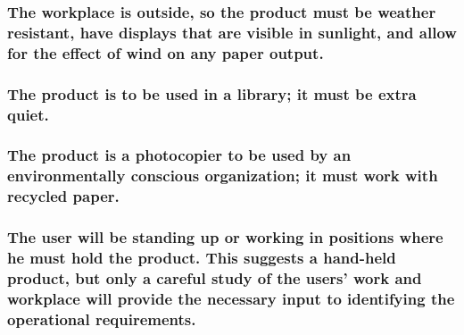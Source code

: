 \documentclass[
]{article}
\begin{document}
\hypertarget{the-workplace-is-outside-so-the-product-must-be-weather-resistant-have-displays-that-are-visible-in-sunlight-and-allow-for-the-effect-of-wind-on-any-paper-output.}{%
\subsubsection{\texorpdfstring{The workplace is outside, so the product
must be weather resistant, have displays that are visible in sunlight,
and allow for the effect of wind on any paper output.
}{The workplace is outside, so the product must be weather resistant, have displays that are visible in sunlight, and allow for the effect of wind on any paper output. }}\label{the-workplace-is-outside-so-the-product-must-be-weather-resistant-have-displays-that-are-visible-in-sunlight-and-allow-for-the-effect-of-wind-on-any-paper-output.}}

\hypertarget{the-product-is-to-be-used-in-a-library-it-must-be-extra-quiet.}{%
\subsubsection{\texorpdfstring{The product is to be used in a library;
it must be extra quiet.
}{The product is to be used in a library; it must be extra quiet. }}\label{the-product-is-to-be-used-in-a-library-it-must-be-extra-quiet.}}

\hypertarget{the-product-is-a-photocopier-to-be-used-by-an-environmentally-conscious-organization-it-must-work-with-recycled-paper.}{%
\subsubsection{\texorpdfstring{The product is a photocopier to be used
by an environmentally conscious organization; it must work with recycled
paper.
}{The product is a photocopier to be used by an environmentally conscious organization; it must work with recycled paper. }}\label{the-product-is-a-photocopier-to-be-used-by-an-environmentally-conscious-organization-it-must-work-with-recycled-paper.}}

\hypertarget{the-user-will-be-standing-up-or-working-in-positions-where-he-must-hold-the-product.-this-suggests-a-hand-held-product-but-only-a-careful-study-of-the-users-work-and-workplace-will-provide-the-necessary-input-to-identifying-the-operational-requirements.}{%
\subsubsection{The user will be standing up or working in positions
where he must hold the product. This suggests a hand-held product, but
only a careful study of the users' work and workplace will provide the
necessary input to identifying the operational
requirements.}\label{the-user-will-be-standing-up-or-working-in-positions-where-he-must-hold-the-product.-this-suggests-a-hand-held-product-but-only-a-careful-study-of-the-users-work-and-workplace-will-provide-the-necessary-input-to-identifying-the-operational-requirements.}}
\end{document}
